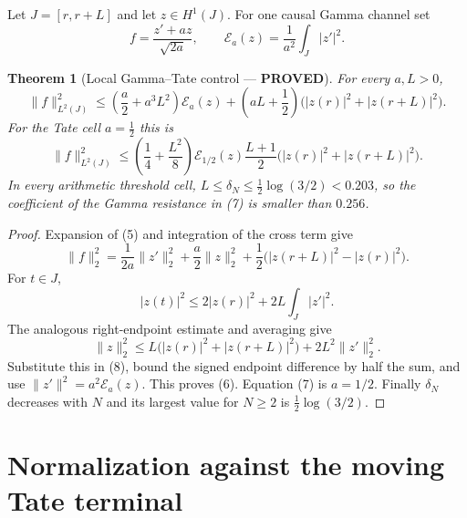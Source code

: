 \documentclass[11pt]{article}
\newcommand{\PROVED}{\textcolor{green!40!black}{\textbf{PROVED}}}
\newtheorem{theorem}{Theorem}
\begin{document}
Let $J=[r,r+L]$ and let $z\in H^1(J)$.  For one causal Gamma channel set
\begin{equation}
 f=\frac{z'+az}{\sqrt{2a}},\qquad
 \mathcal E_a(z)=\frac1{a^2}\int_J|z'|^2.                    \tag{5}
\end{equation}

\begin{theorem}[Local Gamma--Tate control --- \PROVED]
For every $a,L>0$,
\begin{equation}
 \boxed{
 \|f\|_{L^2(J)}^2
 \le\left(\frac a2+a^3L^2\right)\mathcal E_a(z)
    +\left(aL+\frac12\right)
       \bigl(|z(r)|^2+|z(r+L)|^2\bigr).}                    \tag{6}
\end{equation}
For the Tate cell $a=\frac12$ this is
\begin{equation}
 \|f\|_{L^2(J)}^2
 \le\left(\frac14+\frac{L^2}{8}\right)\mathcal E_{1/2}(z)
  \frac{L+1}{2}\bigl(|z(r)|^2+|z(r+L)|^2\bigr).             \tag{7}
\end{equation}
In every arithmetic threshold cell,
$L\le\delta_N\le\frac12\log(3/2)<0.203$, so the coefficient of the Gamma
resistance in (7) is smaller than $0.256$.
\end{theorem}

\begin{proof}
Expansion of (5) and integration of the cross term give
\begin{equation}
 \|f\|_2^2
 =\frac1{2a}\|z'\|_2^2+\frac a2\|z\|_2^2
   +\frac12\bigl(|z(r+L)|^2-|z(r)|^2\bigr).                  \tag{8}
\end{equation}
For $t\in J$,
\[
 |z(t)|^2\le2|z(r)|^2+2L\int_J|z'|^2.
\]
The analogous right-endpoint estimate and averaging give
\[
 \|z\|_2^2\le
 L\bigl(|z(r)|^2+|z(r+L)|^2\bigr)+2L^2\|z'\|_2^2.
\]
Substitute this in (8), bound the signed endpoint difference by half the
sum, and use $\|z'\|^2=a^2\mathcal E_a(z)$.  This proves (6).
Equation (7) is $a=1/2$.  Finally $\delta_N$ decreases with $N$ and its
largest value for $N\ge2$ is $\frac12\log(3/2)$.
\end{proof}

\section{Normalization against the moving Tate terminal}
\end{document}
